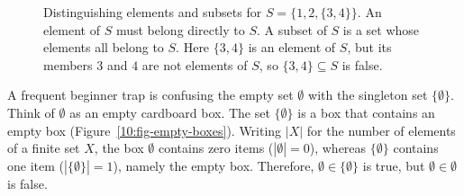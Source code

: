 \begin{figure}[htbp]
\caption{Distinguishing elements and subsets for $S = \{1, 2, \{3, 4\}\}$. An element of $S$ must belong directly to $S$. A subset of $S$ is a set whose elements all belong to $S$. Here $\{3, 4\}$ is an element of $S$, but its members $3$ and $4$ are not elements of $S$, so $\{3, 4\} \subseteq S$ is false.}\label{10:fig-element-vs-subset}
\end{figure}

\begin{trapbox}
A frequent beginner trap is confusing the empty set $\emptyset$ with the singleton set $\{\emptyset\}$. Think of $\emptyset$ as an empty cardboard box. The set $\{\emptyset\}$ is a box that contains an empty box (Figure~\ref{10:fig-empty-boxes}). Writing $|X|$ for the number of elements of a finite set $X$, the box $\emptyset$ contains zero items ($|\emptyset| = 0$), whereas $\{\emptyset\}$ contains one item ($|\{\emptyset\}| = 1$), namely the empty box. Therefore, $\emptyset \in \{\emptyset\}$ is true, but $\emptyset \in \emptyset$ is false.
\end{trapbox}

